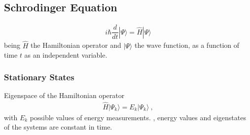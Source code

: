 \documentclass[letterpaper,10pt,english]{jupyterBook}
\begin{document}
\subsection{Schrodinger Equation}
\label{\detokenize{ch/quantum-mechanics/intro:schrodinger-equation}}\label{\detokenize{ch/quantum-mechanics/intro:quantum-mechanics-intro-non-relativistic-schrodinger-equation}}\begin{equation*}
\begin{split}i \hbar \dfrac{d}{dt} | \Psi \rangle = \hat{H} | \Psi \rangle \end{split}
\end{equation*}
\sphinxAtStartPar
being \(\hat{H}\) the Hamiltonian operator and \(|\Psi\rangle\) the wave function, as a function of time \(t\) as an independent variable.


\subsubsection{Stationary States}
\label{\detokenize{ch/quantum-mechanics/intro:stationary-states}}\label{\detokenize{ch/quantum-mechanics/intro:quantum-mechanics-intro-non-relativistic-schrodinger-equation-hamiltonian}}
\sphinxAtStartPar
Eigenspace of the Hamiltonian operator
\begin{equation*}
\begin{split}\hat{H} |\Psi_k \rangle = E_k |\Psi_k \rangle \ ,\end{split}
\end{equation*}
\sphinxAtStartPar
with \(E_k\) possible values of energy measurements. 
  , energy values and eigenstates of the systems are constant in time.
\end{document}
